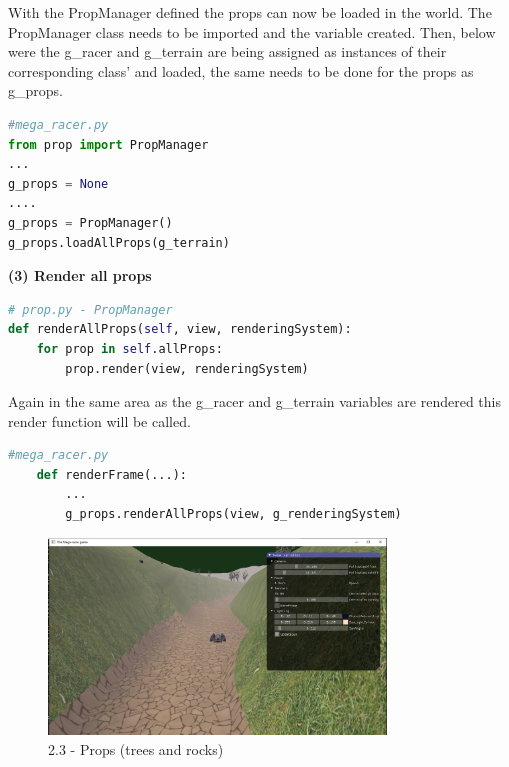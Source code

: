 \documentclass[a4 paper, 12pt]{article}
\begin{document}
With the PropManager defined the props can now be loaded in the world. The PropManager class needs to be imported and the variable created. Then, below were the g\_racer and g\_terrain are being assigned as instances of their corresponding class' and loaded, the same needs to be done for the props as g\_props.

    \begin{lstlisting}[language=python]
#mega_racer.py
from prop import PropManager
...
g_props = None
....
g_props = PropManager()
g_props.loadAllProps(g_terrain)
    \end{lstlisting}


\textbf{(3) Render all props}   
    \begin{lstlisting}[language=python]
# prop.py - PropManager 
def renderAllProps(self, view, renderingSystem):
    for prop in self.allProps:
        prop.render(view, renderingSystem)
    \end{lstlisting}

Again in the same area as the g\_racer and g\_terrain variables are rendered this render function will be called. 
    \begin{lstlisting}[language=python]
    #mega_racer.py    
    def renderFrame(...):
        ...
        g_props.renderAllProps(view, g_renderingSystem)
    \end{lstlisting}

    \begin{figure} [H]
        \centering
        \includegraphics[width=0.8\textwidth, frame]
            {./images/mega_racer/2.3.PNG}  
        \caption{2.3 - Props (trees and rocks)}   
    \end{figure}
\end{document}
